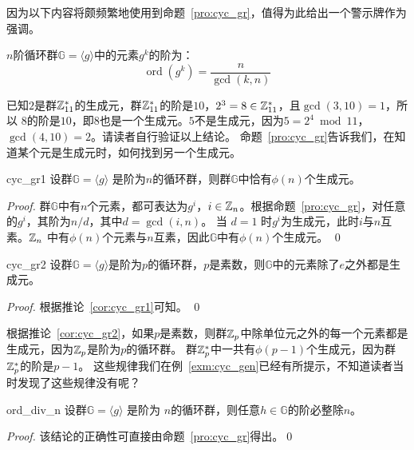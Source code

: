 因为以下内容将颇频繁地使用到命题~\ref{pro:cyc_gr}，值得为此给出一个警示牌作为强调。
\begin{center}
\begin{tcolorbox}[colback=green!5!white, colframe=red!75!black,width = 10cm]
	$n$阶循环群$\mathbb{G} = \langle g \rangle$中的元素$g^k$的阶为：
		\[ \operatorname{ord}(g^k) = \dfrac{n}{\gcd(k,n)}\]
\end{tcolorbox}
\end{center}

\begin{example}
\label{exm:gen_gen}
已知$2$是群${\mathbb Z}_{11}^*$的生成元，群${\mathbb Z}_{11}^*$的阶是$10$，$2^3 = 8 \in {\mathbb Z}_{11}^*$，且$\gcd(3, 10) =1$，所以
$8$的阶是$10$，即$8$也是一个生成元。$5$不是生成元，因为$5 = 2^4 \bmod 11$，$\gcd(4, 10) = 2$。请读者自行验证以上结论。
命题~\ref{pro:cyc_gr}告诉我们，在知道某个元是生成元时，如何找到另一个生成元。
\end{example}
		
\begin{corollary}{}{cyc_gr1}
	   设群$\mathbb{G} = \langle g \rangle$ 是阶为$n$的循环群，则群$\mathbb{G}$中恰有$\phi(n)$个生成元。
\end{corollary}
		
\begin{proof}
		群$\mathbb{G}$中有$n$个元素，都可表达为$g^i$，$i \in {\mathbb Z}_n$。根据命题~\ref{pro:cyc_gr}，对任意的$g^i$，其阶为$n/d$，其中$d = \gcd(i, n)$。
		当 $d = 1$ 时$g^i$为生成元，此时$i$与$n$互素。${\mathbb Z}_n$ 中有$\phi(n)$个元素与$n$互素，因此$\mathbb{G}$中有$\phi(n)$个生成元。
		\qed
\end{proof}

 \begin{corollary}{}{cyc_gr2}
		设群$\mathbb{G} = \langle g \rangle$是阶为$p$的循环群，$p$是素数，则$\mathbb{G}$中的元素除了$e$之外都是生成元。
\end{corollary}
		
\begin{proof}
		根据推论~\ref{cor:cyc_gr1}可知。
		\qed
\end{proof}
\begin{example}
		根据推论~\ref{cor:cyc_gr2}，如果$p$是素数，则群${\mathbb Z}_p$中除单位元之外的每一个元素都是生成元，因为${\mathbb Z}_p$是阶为$p$的循环群。
		群${\mathbb Z}_p^*$中一共有$\phi(p-1)$个生成元，因为群${\mathbb Z}_p^*$的阶是$p-1$。
		这些规律我们在例~\ref{exm:cyc_gen}已经有所提示，不知道读者当时发现了这些规律没有呢？
\end{example}
\begin{corollary}{}{ord_div_n}
	设群$\mathbb{G} = \langle g \rangle$ 是阶为 $n$的循环群，则任意$h\in \mathbb{G} $的阶必整除$n$。
\end{corollary}
\begin{proof}
该结论的正确性可直接由命题~\ref{pro:cyc_gr}得出。\qed
\end{proof}

